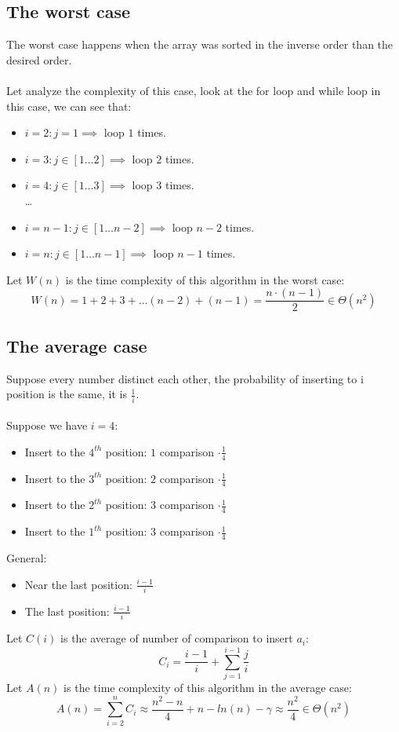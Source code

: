 \documentclass[a4paper]{article}
\begin{document}
\subsection{The worst case}
The worst case happens when the array was sorted in the inverse order than the desired order. \\
\\
Let analyze the complexity of this case, look at the for loop and while loop in this case, we can see that:
\begin{itemize}
    \item $i=2: j = 1 \implies$ loop $1$ times.
    \item $i=3: j \in [1 \ldots 2] \implies$ loop $2$ times.
    \item $i=4: j \in [1 \ldots 3] \implies$ loop $3$ times. \\
    \ldots
    \item $i=n-1: j \in [1 \ldots n-2] \implies$ loop $n-2$ times.
    \item $i=n: j \in [1 \ldots n-1] \implies$ loop $n-1$ times.
\end{itemize}
Let $W(n)$ is the time complexity of this algorithm in the worst case:
\begin{equation*}
    W(n) = 1 + 2 + 3 + \dots (n-2) + (n-1) = \frac{n \cdot (n-1)}{2} \in \Theta(n^2) 
\end{equation*}
\subsection{The average case}
Suppose every number distinct each other, the probability of inserting to i position is the same, it is $\frac{1}{i}$. \\
\\
Suppose we have $i=4$:
\begin{itemize}
    \item Insert to the $4^{th}$ position: $1$ comparison $\cdot \frac{1}{4}$
    \item Insert to the $3^{th}$ position: $2$ comparison $\cdot \frac{1}{4}$
    \item Insert to the $2^{th}$ position: $3$ comparison $\cdot \frac{1}{4}$
    \item Insert to the $1^{th}$ position: $3$ comparison $\cdot \frac{1}{4}$
\end{itemize}
General: 
\begin{itemize}
    \item Near the last position: $\frac{i-1}{i}$
    \item The last position: $\frac{i-1}{i}$
\end{itemize}
Let $C(i)$ is the average of number of comparison to insert $a_i$:
\begin{equation*}
    C_i = \frac{i-1}{i} + \sum_{j=1}^{i-1} \frac{j}{i} 
\end{equation*}
Let $A(n)$ is the time complexity of this algorithm in the average case:
\begin{equation*}
    A(n) = \sum_{i=2}^{n} C_i \approx \frac{n^2 - n}{4} + n - ln(n) - \gamma \approx \frac{n^2}{4} \in \Theta(n^2)
\end{equation*}
\newpage
\end{document}
